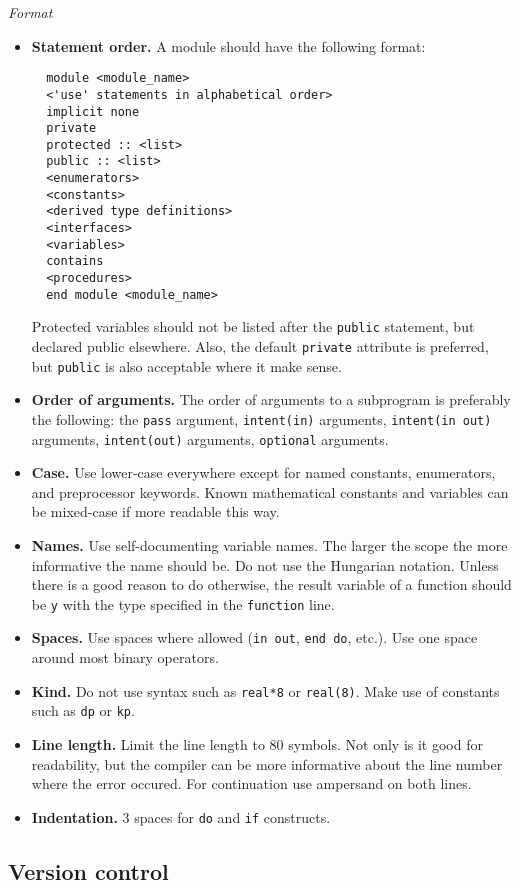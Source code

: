 \documentclass{article}
\begin{document}
\noindent\textit{Format}

\begin{itemize}
\item \textbf{Statement order.} A module should have the following format:
\begin{verbatim}
  module <module_name>
  <'use' statements in alphabetical order>
  implicit none
  private
  protected :: <list>
  public :: <list>
  <enumerators>
  <constants>
  <derived type definitions>
  <interfaces>
  <variables>
  contains
  <procedures>
  end module <module_name>
\end{verbatim}
  Protected variables should not be listed after the \texttt{public} statement, but declared public elsewhere. Also, the default \texttt{private} attribute is preferred, but \texttt{public} is also acceptable where it make sense.
\item \textbf{Order of arguments.} The order of arguments to a subprogram is preferably the following: the \texttt{pass} argument, \texttt{intent(in)} arguments, \texttt{intent(in out)} arguments, \texttt{intent(out)} arguments, \texttt{optional} arguments.
\item \textbf{Case.} Use lower-case everywhere except for named constants, enumerators, and preprocessor keywords. Known mathematical constants and variables can be mixed-case if more readable this way.
\item \textbf{Names.} Use self-documenting variable names. The larger the scope the more informative the name should be. Do not use the Hungarian notation. Unless there is a good reason to do otherwise, the result variable of a function should be \texttt{y} with the type specified in the \texttt{function} line.
\item \textbf{Spaces.} Use spaces where allowed (\texttt{in out}, \texttt{end do}, etc.). Use one space around most binary operators.
\item \textbf{Kind.} Do not use syntax such as \texttt{real*8} or \texttt{real(8)}. Make use of constants such as \texttt{dp} or \texttt{kp}.
\item \textbf{Line length.} Limit the line length to 80 symbols. Not only is it good for readability, but the compiler can be more informative about the line number where the error occured. For continuation use ampersand on both lines.
\item \textbf{Indentation.} 3 spaces for \texttt{do} and \texttt{if} constructs.
\end{itemize}

\subsection{Version control}
\end{document}
